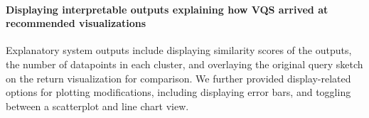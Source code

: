\paragraph{Displaying interpretable outputs explaining how VQS arrived at recommended visualizations} 
Explanatory system outputs include displaying similarity scores of the outputs, the number of datapoints in each cluster, and overlaying the original query sketch on the return visualization for comparison. We further provided display-related options for plotting modifications, including displaying error bars, and toggling between a scatterplot and line chart view.
